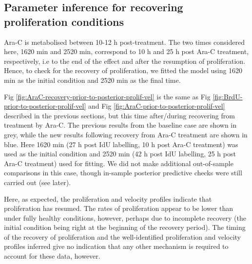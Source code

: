 \documentclass[10pt,letterpaper]{article}
\begin{document}
\subsection{Parameter inference for recovering proliferation
conditions}\label{parameter-inference-for-recovering-proliferation-conditions}

Ara-C is metabolised between 10-12 h post-treatment. The two times
considered here, 1620 min and 2520 min, correspond to 10 h and 25 h post
Ara-C treatment, respectively, i.e to the end of the effect and after
the resumption of proliferation. Hence, to check for the recovery of
proliferation, we fitted the model using 1620 min as the initial
condition and 2520 min as the final time.

Fig \ref{fig:AraC-recovery-prior-to-posterior-prolif-vel} is the same as
Fig \ref{fig:BrdU-prior-to-posterior-prolif-vel} and Fig
\ref{fig:AraC-prior-to-posterior-prolif-vel} described in the previous
sections, but this time after/during recovering from treatment by Ara-C.
The previous results from the baseline case are shown in grey, while the
new results following recovery from Ara-C treatment are shown in blue.
Here 1620 min (27 h post IdU labelling, 10 h post Ara-C treatment) was
used as the initial condition and 2520 min (42 h post IdU labelling, 25
h post Ara-C treatment) used for fitting. We did not make additional
out-of-sample comparisons in this case, though in-sample posterior
predictive checks were still carried out (see later).

Here, as expected, the proliferation and velocity profiles indicate that
proliferation has resumed. The rates of proliferation appear to be lower
than under fully healthy conditions, however, perhaps due to incomplete
recovery (the initial condition being right at the beginning of the
recovery period). The timing of the recovery of proliferation and the
well-identified proliferation and velocity profiles inferred give no
indication that any other mechanism is required to account for these
data, however.
\end{document}
